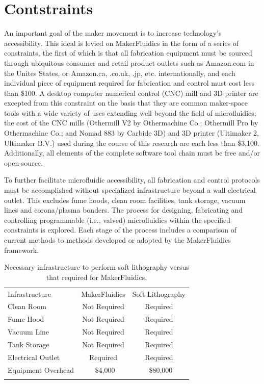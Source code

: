 \section{Contstraints}
\label{sec:mfConstraints}
An important goal of the maker movement is to increase technology's accessibility. This ideal is levied on MakerFluidics in the form of a series of constraints, the first of which is that all fabrication equipment must be sourced through ubiquitous consumer and retail product outlets such as Amazon.com in the Unites States, or Amazon.ca, .co.uk, .jp, etc. internationally, and each individual piece of equipment required for fabrication and control must cost less than \$100. A desktop computer numerical control (CNC) mill and 3D printer are excepted from this constraint on the basis that they are common maker-space tools with a wide variety of uses extending well beyond the field of microfluidics; the cost of the CNC mills (Othermill V2 by Othermachine Co.; Othermill Pro by Othermachine Co.; and Nomad 883 by Carbide 3D) and 3D printer (Ultimaker 2, Ultimaker B.V.) used during the course of this research are each less than \$3,100. Additionally, all elements of the complete software tool chain must be free and/or open-source. 

To further facilitate microfluidic accessibility, all fabrication and control protocols must be accomplished without specialized infrastructure beyond a wall electrical outlet. This excludes fume hoods, clean room facilities, tank storage, vacuum lines and corona/plasma bonders. The process for designing, fabricating and controlling programmable (i.e., valved) microfluidics within the specified constraints is explored. Each stage of the process includes a comparison of current methods to methods developed or adopted by the MakerFluidics framework. 

\begin{table}[H]
\caption[Infrastructure requirements for soft lithography versus MakerFluidics]{Necessary infrastructure to perform soft lithography versus that required for MakerFluidics.}
\label{tab:mfInf}       %
\centering
\begin{tabular}{lcc}
\hline\noalign{\smallskip}
Infrastructure & MakerFluidics & Soft Lithography\\
\noalign{\smallskip}\hline\noalign{\smallskip}
Clean Room & Not Required & Required \\
Fume Hood & Not Required & Required \\
Vacuum Line & Not Required & Required \\
Tank Storage & Not Required & Required \\
Electrical Outlet & Required & Required \\
Equipment Overhead & ~\$4,000 & ~\$80,000 \\
\noalign{\smallskip}\hline
\end{tabular}
\end{table}


